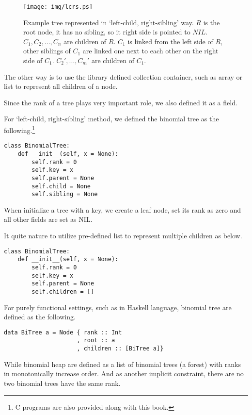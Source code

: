 \documentclass{article}
\begin{document}
\begin{figure}[htbp]
  \centering
  \texttt{[image: img/lcrs.ps]}
  \caption{Example tree represented in `left-child, right-sibling' way. $R$ is the root node, it has no sibling, so it right side is pointed to $NIL$. $C_1, C_2, ..., C_n$ are children of $R$. $C_1$ is linked from the left side of $R$, other siblings of $C_1$ are linked one next to each other on the right side of $C_1$. $C_2', ..., C_m'$ are children of $C_1$.} \label{fig:lcrs}
\end{figure}

The other way is to use the library defined collection container, such
as array or list to represent all children of a node.

Since the rank of a tree plays very important role, we also defined
it as a field.

For `left-child, right-sibling' method, we defined the binomial tree
as the following.\footnote{C programs are also provided along with this book.}

\lstset{language=Python}
\begin{lstlisting}
class BinomialTree:
    def __init__(self, x = None):
        self.rank = 0
        self.key = x
        self.parent = None
        self.child = None
        self.sibling = None
\end{lstlisting}

When initialize a tree with a key, we create a leaf node, set its rank
as zero and all other fields are set as NIL.

It quite nature to utilize pre-defined list to represent multiple children
as below.

\begin{lstlisting}
class BinomialTree:
    def __init__(self, x = None):
        self.rank = 0
        self.key = x
        self.parent = None
        self.children = []
\end{lstlisting}

For purely functional settings, such as in Haskell language, binomial tree
are defined as the following.

\lstset{language=Haskell}
\begin{lstlisting}
data BiTree a = Node { rank :: Int
                     , root :: a
                     , children :: [BiTree a]}
\end{lstlisting}

While binomial heap are defined as a list of binomial trees (a forest) with
ranks in monotonically increase order. And as another implicit constraint,
there are no two binomial trees have the same rank.
\end{document}
